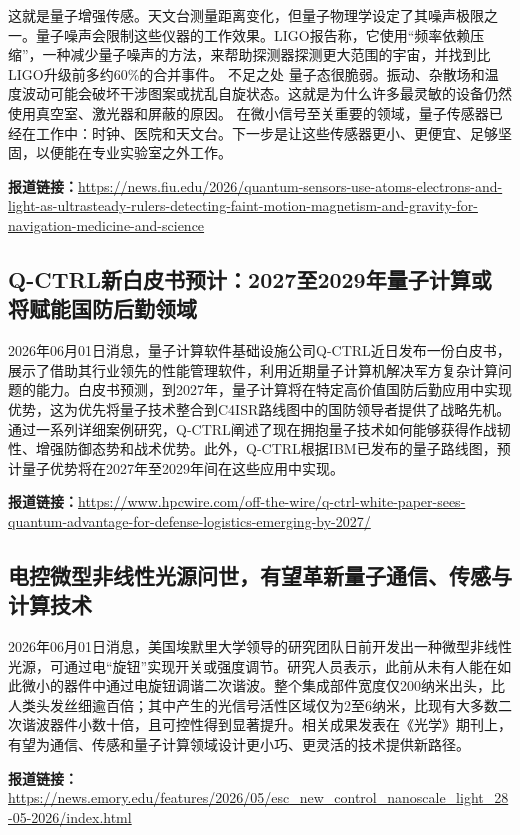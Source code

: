 \documentclass[12pt,a4paper]{ctexart}
\begin{document}
这就是量子增强传感。天文台测量距离变化，但量子物理学设定了其噪声极限之一。量子噪声会限制这些仪器的工作效果。LIGO报告称，它使用“频率依赖压缩”，一种减少量子噪声的方法，来帮助探测器探测更大范围的宇宙，并找到比LIGO升级前多约60\%的合并事件。
不足之处
量子态很脆弱。振动、杂散场和温度波动可能会破坏干涉图案或扰乱自旋状态。这就是为什么许多最灵敏的设备仍然使用真空室、激光器和屏蔽的原因。
在微小信号至关重要的领域，量子传感器已经在工作中：时钟、医院和天文台。下一步是让这些传感器更小、更便宜、足够坚固，以便能在专业实验室之外工作。

\noindent\textbf{报道链接：}\url{https://news.fiu.edu/2026/quantum-sensors-use-atoms-electrons-and-light-as-ultrasteady-rulers-detecting-faint-motion-magnetism-and-gravity-for-navigation-medicine-and-science}

\subsection{ Q-CTRL新白皮书预计：2027至2029年量子计算或将赋能国防后勤领域 }

2026年06月01日消息，量子计算软件基础设施公司Q-CTRL近日发布一份白皮书，展示了借助其行业领先的性能管理软件，利用近期量子计算机解决军方复杂计算问题的能力。白皮书预测，到2027年，量子计算将在特定高价值国防后勤应用中实现优势，这为优先将量子技术整合到C4ISR路线图中的国防领导者提供了战略先机。通过一系列详细案例研究，Q-CTRL阐述了现在拥抱量子技术如何能够获得作战韧性、增强防御态势和战术优势。此外，Q-CTRL根据IBM已发布的量子路线图，预计量子优势将在2027年至2029年间在这些应用中实现。

\noindent\textbf{报道链接：}\url{https://www.hpcwire.com/off-the-wire/q-ctrl-white-paper-sees-quantum-advantage-for-defense-logistics-emerging-by-2027/}

\subsection{ 电控微型非线性光源问世，有望革新量子通信、传感与计算技术 }

2026年06月01日消息，美国埃默里大学领导的研究团队日前开发出一种微型非线性光源，可通过电“旋钮”实现开关或强度调节。研究人员表示，此前从未有人能在如此微小的器件中通过电旋钮调谐二次谐波。整个集成部件宽度仅200纳米出头，比人类头发丝细逾百倍；其中产生的光信号活性区域仅为2至6纳米，比现有大多数二次谐波器件小数十倍，且可控性得到显著提升。相关成果发表在《光学》期刊上，有望为通信、传感和量子计算领域设计更小巧、更灵活的技术提供新路径。

\noindent\textbf{报道链接：}\url{https://news.emory.edu/features/2026/05/esc\_new\_control\_nanoscale\_light\_28-05-2026/index.html}
\end{document}
